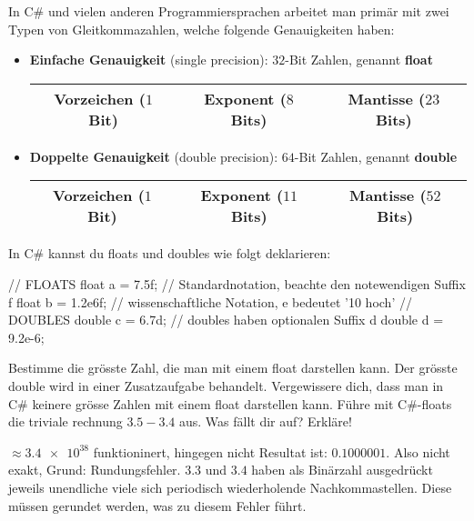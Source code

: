 \newpage

In C\# und vielen anderen Programmiersprachen arbeitet man primär mit zwei Typen von Gleitkommazahlen, welche folgende Genauigkeiten haben:
\begin{itemize}
	\vspace{-\topsep}
	\item \textbf{Einfache Genauigkeit} (single precision): $32$-Bit Zahlen, genannt \textbf{float}
	\begin{table}[H]
		\centering
		\renewcommand{\arraystretch}{1.5}
		\begin{tabular}{|c|c|c|}
		\hline
		\cellcolor{blue!25} Vorzeichen ($1$ Bit) & 
		\cellcolor{green!25} Exponent ($8$ Bits) &
		\cellcolor{red!25} Mantisse ($23$ Bits) \\ \hline
		\end{tabular}
	\end{table}
	\item \textbf{Doppelte Genauigkeit} (double precision): $64$-Bit Zahlen, genannt \textbf{double}
	\begin{table}[H]
		\centering
		\renewcommand{\arraystretch}{1.5}
		\begin{tabular}{|c|c|c|}
		\hline
		\cellcolor{blue!25} Vorzeichen ($1$ Bit) & 
		\cellcolor{green!25} Exponent ($11$ Bits) &
		\cellcolor{red!25} Mantisse ($52$ Bits) \\ \hline
		\end{tabular}
	\end{table}
\end{itemize}

In C\# kannst du floats und doubles wie folgt deklarieren:
\begin{csharp}
// FLOATS
float a = 7.5f; // Standardnotation, beachte den notewendigen Suffix f
float b = 1.2e6f; // wissenschaftliche Notation, e bedeutet '10 hoch'
// DOUBLES
double c = 6.7d; // doubles haben optionalen Suffix d
double d = 9.2e-6;
\end{csharp}

\begin{question}
	\begin{tasks}
		\task Bestimme die grösste Zahl, die man mit einem float darstellen kann. Der grösste double wird in einer Zusatzaufgabe behandelt.
		\newpage
		\task Vergewissere dich, dass man in C\# keinere grösse Zahlen mit einem float darstellen kann.
		\task Führe mit C\#-floats die triviale rechnung $3.5 - 3.4$ aus. Was fällt dir auf? Erkläre!
	\end{tasks}	
\end{question}
\begin{solution}
	\begin{tasks}
		\task $\approx \num{3.4e38}$
		\task {} funktioninert,  hingegen nicht
		\task Resultat ist: $0.1000001$. Also nicht exakt, Grund: Rundungsfehler. $3.3$ und $3.4$ haben als Binärzahl ausgedrückt jeweils unendliche viele sich periodisch wiederholende Nachkommastellen. Diese müssen gerundet werden, was zu diesem Fehler führt.
	\end{tasks}
\end{solution}


